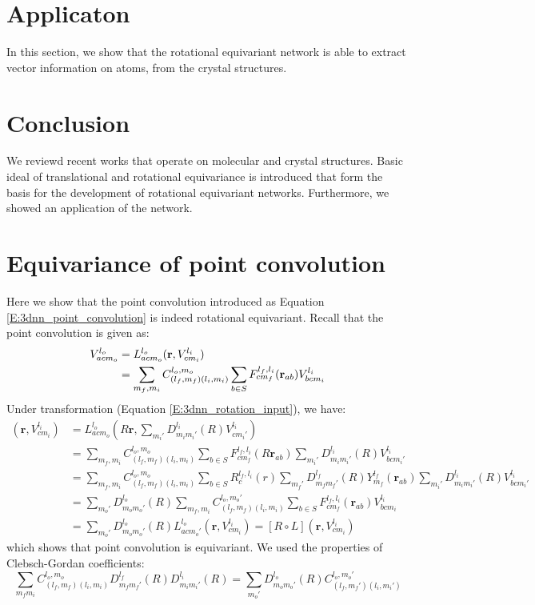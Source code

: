 \documentclass{IEEEtran}
\begin{document}
\section{Applicaton}
In this section, we show that the rotational equivariant network is able to extract vector information 
on atoms, from the crystal structures.

\section{Conclusion}
We reviewd recent works that operate on molecular and crystal structures. 
Basic ideal of translational and rotational equivariance is introduced that form the basis
for the development of rotational equivariant networks. Furthermore, we showed
an application of the network. 

\printbibliography[title={Reference}]

\onecolumn

\appendices

\section{Equivariance of point convolution}
\label{A:proof_equivariance_point}
Here we show that the point convolution introduced as Equation \eqref{E:3dnn_point_convolution} is indeed 
rotational equivariant. Recall that the point convolution is given as:
\begin{align*}
    V_{acm_o}^{l_o} &= L^{l_o}_{acm_o} (\mathbf{r}, V_{cm_i}^{l_i}) \notag\\
    &= \sum_{m_f, m_i} C^{l_o,m_o}_{(l_f, m_f)(l_i,m_i)} \sum_{b \in S} F_{cm_f}^{l_f, l_i}(\mathbf{r}_{ab}) V^{l_i}_{bcm_i}
\end{align*}
Under transformation (Equation \eqref{E:3dnn_rotation_input}), we have:
\begin{align*}
    [ L \circ R ] (\mathbf{r}, V_{cm_i}^{l_i}) &= 
    L^{l_o}_{acm_o} (R \mathbf{r}, \sum_{m_i'}D_{m_im_i'}^{l_i}(R)V_{cm_i'}^{l_i}) \\
    &= \sum_{m_f, m_i} C^{l_o,m_o}_{(l_f, m_f)(l_i,m_i)} \sum_{b \in S} F_{cm_f}^{l_f, l_i}(R\mathbf{r}_{ab}) \sum_{m_i'}D_{m_im_i'}^{l_i}(R)V_{bcm_i'}^{l_i} \\
    &= \sum_{m_f, m_i} C^{l_o,m_o}_{(l_f, m_f)(l_i,m_i)} 
            \sum_{b \in S} R_c^{l_f, l_i} (r) \sum_{m_f'} D_{m_fm_f'}^{l_f}(R)  Y_{m_f}^{l_f}(\mathbf{r}_{ab}) \sum_{m_i'}D_{m_im_i'}^{l_i}(R)V_{bcm_i'}^{l_i} \\
    &= \sum_{m_o'} D_{m_om_o'}^{l_o}(R) \sum_{m_f, m_i} C^{l_o,m_o'}_{(l_f, m_f)(l_i,m_i)}  \sum_{b \in S} F_{cm_f}^{l_f, l_i}(\mathbf{r}_{ab}) V_{bcm_i}^{l_i} \\
    &= \sum_{m_o'} D_{m_om_o'}^{l_o}(R) L^{l_o}_{acm_o'} (\mathbf{r}, V_{cm_i}^{l_i}) = [ R \circ L ] (\mathbf{r}, V_{cm_i}^{l_i})
\end{align*}
which shows that point convolution is equivariant. We used the properties of Clebsch-Gordan coefficients:
\begin{equation}
    \sum_{m_fm_i} C^{l_o,m_o}_{(l_f, m_f)(l_i,m_i)} D_{m_fm_f'}^{l_f}(R) D_{m_im_i'}^{l_i}(R) = \sum_{m_o'} D_{m_om_o'}^{l_o}(R) C^{l_o,m_o'}_{(l_f, m_f')(l_i,m_i')}
\end{equation}
\end{document}
